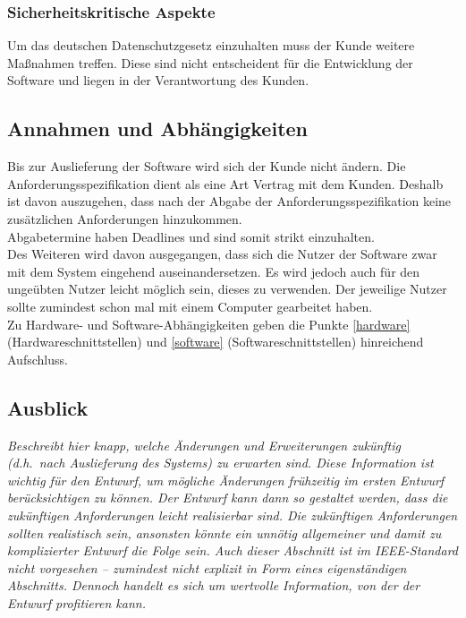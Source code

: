 \documentclass[fontsize=12pt,paper=a4,twoside]{scrartcl}
\begin{document}
\subsubsection{Sicherheitskritische Aspekte}

Um das deutschen Datenschutzgesetz einzuhalten muss der Kunde weitere Maßnahmen treffen. Diese sind nicht entscheident für die Entwicklung der Software und liegen in der Verantwortung des Kunden.

\subsection{Annahmen und Abhängigkeiten}

Bis zur Auslieferung der Software wird sich der Kunde nicht ändern. Die Anforderungsspezifikation dient 
als eine Art Vertrag mit dem Kunden. Deshalb ist davon auszugehen, dass nach der Abgabe der 
Anforderungsspezifikation keine zusätzlichen Anforderungen hinzukommen. \\
Abgabetermine haben Deadlines und sind somit strikt einzuhalten.\\

Des Weiteren wird davon ausgegangen, dass sich die Nutzer der Software zwar mit dem System 
eingehend auseinandersetzen. Es wird jedoch auch für den ungeübten Nutzer leicht möglich sein, dieses 
zu verwenden. Der jeweilige Nutzer sollte zumindest schon mal mit einem Computer gearbeitet haben.\\

Zu Hardware- und Software-Abhängigkeiten geben die Punkte \ref{hardware} (Hardwareschnittstellen) 
und \ref{software} (Softwareschnittstellen) hinreichend Aufschluss.
 
\subsection{Ausblick}


  {\em Beschreibt hier knapp, welche Änderungen und Erweiterungen
  zukünftig (d.h.\ nach Auslieferung des Systems) zu erwarten sind.
  Diese Information ist wichtig für den Entwurf, um mögliche
  Änderungen frühzeitig im ersten Entwurf berücksichtigen zu können.
  Der Entwurf kann dann so gestaltet werden, dass die zukünftigen
  Anforderungen leicht realisierbar sind. Die zukünftigen
  Anforderungen sollten realistisch sein, ansonsten könnte ein unnötig
  allgemeiner und damit zu komplizierter Entwurf die Folge sein.  Auch
  dieser Abschnitt ist im IEEE-Standard nicht vorgesehen -- zumindest
  nicht explizit in Form eines eigenständigen Abschnitts. Dennoch
  handelt es sich um wertvolle Information, von der der Entwurf
  profitieren kann.}
  
\end{document}
